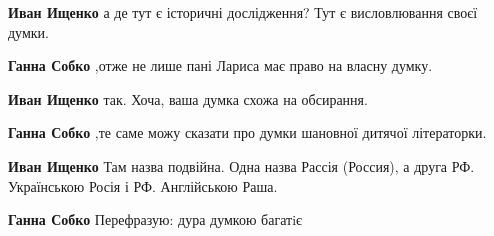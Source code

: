 \begin{itemize}
\begin{itemize}
\textbf{Иван Ищенко} а де тут є історичні дослідження?
Тут є висловлювання своєї думки.

\begin{itemize}
 
\textbf{Ганна Собко} ,отже не лише пані Лариса має право на власну думку.

 
\textbf{Иван Ищенко} так.
Хоча, ваша думка схожа на обсирання.

 
\textbf{Ганна Собко} ,те саме можу сказати про думки шановної дитячої літераторки.

 
\textbf{Иван Ищенко} Там назва подвійна. Одна назва Рассія (Россия), а друга РФ. Українською Росія і РФ. Англійською Раша.

 
\textbf{Ганна Собко} Перефразую: дура думкою багатiє \Smiley[1.0][yellow]

 

\end{itemize}
\end{itemize}
\end{itemize}
